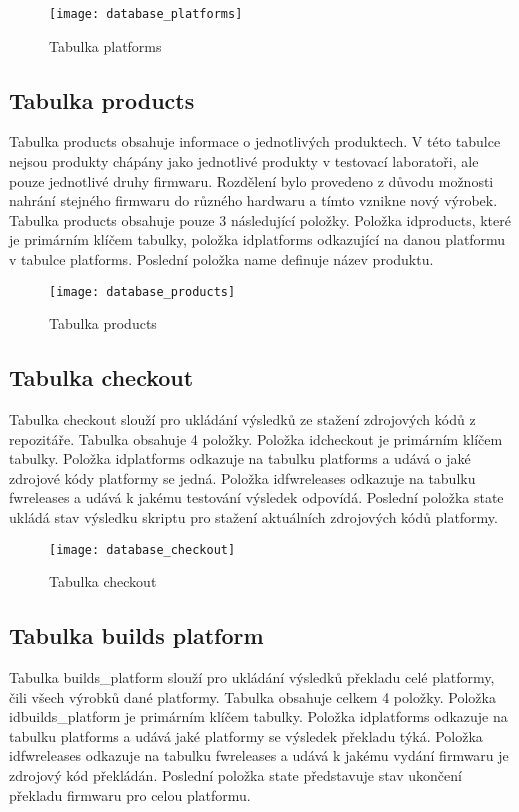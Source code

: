 \begin{figure}[h]
  \centering
  \texttt{[image: database\_platforms]}
  \caption{Tabulka platforms}
  \label{fig:database_platforms}
\end{figure}

\subsection{Tabulka products}
Tabulka products obsahuje informace o jednotlivých produktech. V této tabulce nejsou produkty chápány jako jednotlivé produkty v testovací laboratoři, ale pouze jednotlivé druhy firmwaru. Rozdělení bylo provedeno z důvodu možnosti nahrání stejného firmwaru do různého hardwaru a tímto vznikne nový výrobek. Tabulka products obsahuje pouze 3 následující položky. Položka idproducts, které je primárním klíčem tabulky, položka idplatforms odkazující na danou platformu v tabulce platforms. Poslední položka name definuje název produktu.

\begin{figure}[h]
  \centering
  \texttt{[image: database\_products]}
  \caption{Tabulka products}
  \label{fig:database_products}
\end{figure}

\subsection{Tabulka checkout}
Tabulka checkout slouží pro ukládání výsledků ze stažení zdrojových kódů z repozitáře. Tabulka obsahuje 4 položky. Položka idcheckout je primárním klíčem tabulky. Položka idplatforms odkazuje na tabulku platforms a udává o jaké zdrojové kódy platformy se jedná. Položka idfwreleases odkazuje na tabulku fwreleases a udává k jakému testování výsledek odpovídá. Poslední položka state ukládá stav výsledku skriptu pro stažení aktuálních zdrojových kódů platformy.

\begin{figure}[h]
  \centering
  \texttt{[image: database\_checkout]}
  \caption{Tabulka checkout}
  \label{fig:database_checkout}
\end{figure}

\subsection{Tabulka builds platform}
Tabulka builds\_platform slouží pro ukládání výsledků překladu celé platformy, čili všech výrobků dané platformy. Tabulka obsahuje celkem 4 položky. Položka idbuilds\_platform je primárním klíčem tabulky. Položka idplatforms odkazuje na tabulku platforms a udává jaké platformy se výsledek překladu týká. Položka idfwreleases odkazuje na tabulku fwreleases a udává k jakému vydání firmwaru je zdrojový kód překládán. Poslední položka state představuje stav ukončení překladu firmwaru pro celou platformu.

